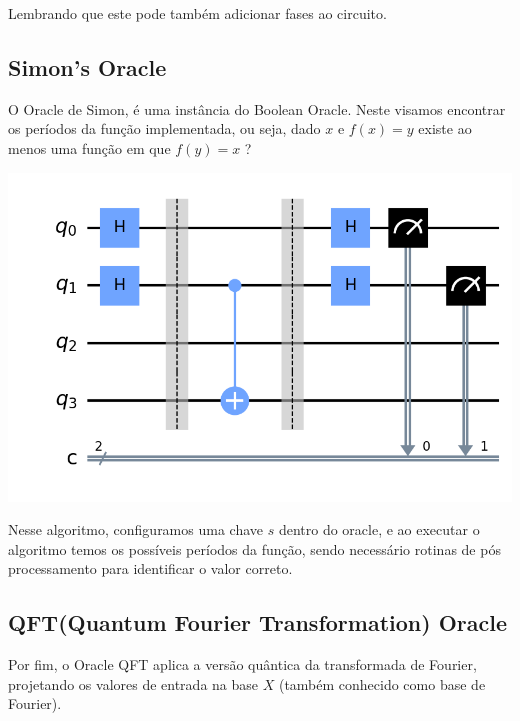\documentclass{article}
\begin{document}
Lembrando que este pode também adicionar fases ao circuito.

\subsection{Simon's Oracle}

O Oracle de Simon, é uma instância do Boolean Oracle. Neste visamos encontrar os períodos da função implementada, ou seja, dado $x$ e $f(x) = y$ existe ao menos uma função em que $f(y) = x$ ?


\begin{center}
	\includegraphics[scale=0.3]{simons.png}
	\label{fig:simons-oracle}
\end{center}

Nesse algoritmo, configuramos uma chave $s$ dentro do oracle, e ao executar o algoritmo temos os possíveis períodos da função, sendo necessário rotinas de pós processamento para identificar o valor correto.

\subsection{QFT(Quantum Fourier Transformation) Oracle}

Por fim, o Oracle QFT aplica a versão quântica da transformada de Fourier, projetando os valores de entrada na base $X$ (também conhecido como base de Fourier).
\end{document}

